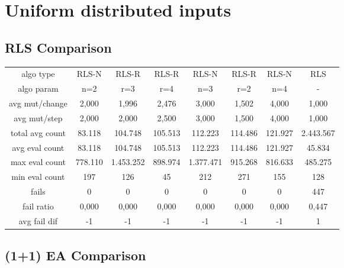 
\section{Uniform distributed inputs}

\subsection{RLS Comparison}


\begin{tabular}[h]{cccccccc}
algo type&            RLS-N&     RLS-R&     RLS-R&     RLS-N&     RLS-R&     RLS-N&       RLS\\
algo param&             n=2&       r=3&       r=4&       n=3&       r=2&       n=4&         -\\
avg mut/change&       2,000&     1,996&     2,476&     3,000&     1,502&     4,000&     1,000\\
avg mut/step&         2,000&     2,000&     2,500&     3,000&     1,500&     4,000&     1,000\\
\hline
total avg count&     83.118&   104.748&   105.513&   112.223&   114.486&   121.927& 2.443.567\\
avg eval count&      83.118&   104.748&   105.513&   112.223&   114.486&   121.927&    45.834\\
max eval count&     778.110& 1.453.252&   898.974& 1.377.471&   915.268&   816.633&   485.275\\
min eval count&         197&       126&        45&       212&       271&       155&       128\\
\hline
fails&                    0&         0&         0&         0&         0&         0&       447\\
fail ratio&           0,000&     0,000&     0,000&     0,000&     0,000&     0,000&     0,447\\
avg fail dif&            -1&        -1&        -1&        -1&        -1&        -1&         1\\
\end{tabular}


\subsection{(1+1) EA Comparison}


